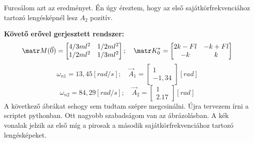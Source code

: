 \documentclass[12pt,twoside]{article}
\begin{document}
{\color{blue} Furcsálom azt az eredményet. Én úgy éreztem, hogy az első sajátkörfrekvenciához tartozó lengésképnél lesz $A_2$ pozitív.}

\textbf{Követő erővel gerjesztett rendszer:}
\begin{equation} \label{eq:Newton}
\matr M(\vec 0)=
\begin{bmatrix}
4/3 ml^2 & 1/2 ml^2 \\
1/2 ml^2 & 1/3 ml^2
\end{bmatrix}; \quad
\matr K_0^* =
\begin{bmatrix}
2k-Fl & -k+Fl \\
-k & k
\end{bmatrix}
\end{equation}
\begin{equation} \label{eq:Newton}
\omega_{n1}=13,45 [rad/s];\quad
\vec A_1=
\begin{bmatrix}
1 \\
-1,34
\end{bmatrix}[rad]
\end{equation}
\begin{equation} \label{eq:Newton}
\omega_{n2}=84,29 [rad/s];\quad
\vec A_2=
\begin{bmatrix}
1 \\
2.17
\end{bmatrix}[rad]
\end{equation}
{\color{blue} A következő ábrákat sehogy sem tudtam szépre megcsinálni. Újra tervezem írni a scriptet pythonban. Ott nagyobb szabadságom van az ábrázolásban. A kék vonalak jelzik az első míg a pirosak a második sajátkörfrekvenciához tartozó lengésképeket.}
\end{document}
